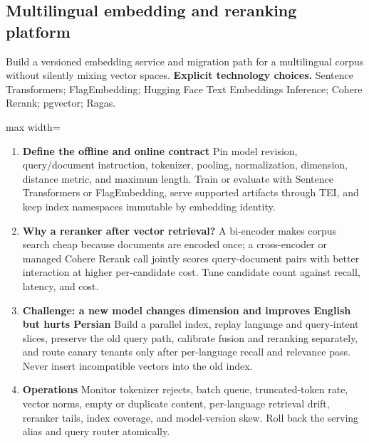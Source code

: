 \subsection{Multilingual embedding and reranking platform}
Build a versioned embedding service and migration path for a multilingual corpus without silently mixing vector spaces.
\textbf{Explicit technology choices.} Sentence Transformers; FlagEmbedding; Hugging Face Text Embeddings Inference; Cohere Rerank; pgvector; Ragas.
\begin{center}\begin{adjustbox}{max width=\linewidth}\end{adjustbox}\end{center}
\begin{enumerate}
\item \textbf{Define the offline and online contract} Pin model revision, query/document instruction, tokenizer, pooling, normalization, dimension, distance metric, and maximum length. Train or evaluate with Sentence Transformers or FlagEmbedding, serve supported artifacts through TEI, and keep index namespaces immutable by embedding identity.
\item \textbf{Why a reranker after vector retrieval?} A bi-encoder makes corpus search cheap because documents are encoded once; a cross-encoder or managed Cohere Rerank call jointly scores query-document pairs with better interaction at higher per-candidate cost. Tune candidate count against recall, latency, and cost.
\item \textbf{Challenge: a new model changes dimension and improves English but hurts Persian} Build a parallel index, replay language and query-intent slices, preserve the old query path, calibrate fusion and reranking separately, and route canary tenants only after per-language recall and relevance pass. Never insert incompatible vectors into the old index.
\item \textbf{Operations} Monitor tokenizer rejects, batch queue, truncated-token rate, vector norms, empty or duplicate content, per-language retrieval drift, reranker tails, index coverage, and model-version skew. Roll back the serving alias and query router atomically.
\end{enumerate}
